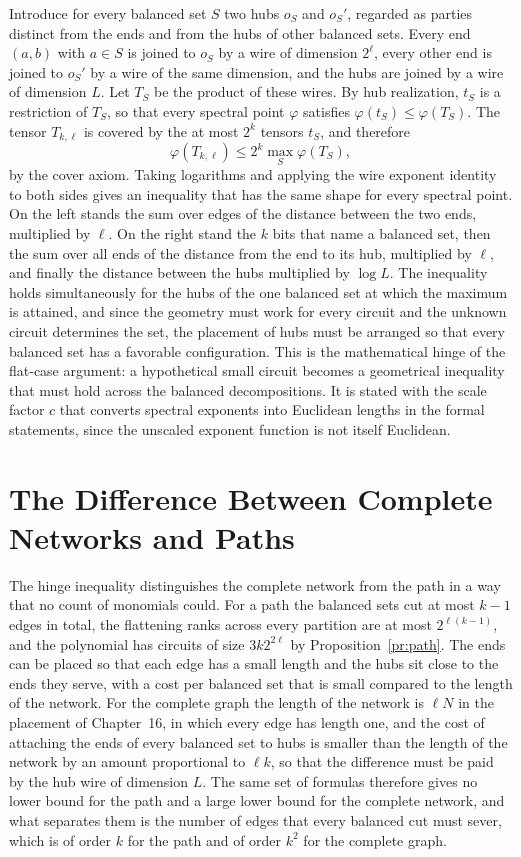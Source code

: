 \documentclass[11pt,letterpaper]{report}
\theoremstyle{plain}
\theoremstyle{definition}
\theoremstyle{remark}
\begin{document}
Introduce for every balanced set $S$ two hubs $o_S$ and $o_S'$, regarded as parties distinct from the ends and from the hubs of other balanced sets. Every end $(a,b)$ with $a\in S$ is joined to $o_S$ by a wire of dimension $2^{\ell}$, every other end is joined to $o_S'$ by a wire of the same dimension, and the hubs are joined by a wire of dimension $L$. Let $T_S$ be the product of these wires. By hub realization, $t_S$ is a restriction of $T_S$, so that every spectral point $\varphi$ satisfies $\varphi(t_S)\le\varphi(T_S)$. The tensor $T_{k,\ell}$ is covered by the at most $2^k$ tensors $t_S$, and therefore
\[
\varphi(T_{k,\ell})\le2^{k}\max_{S}\varphi(T_S),
\]
by the cover axiom. Taking logarithms and applying the wire exponent identity to both sides gives an inequality that has the same shape for every spectral point. On the left stands the sum over edges of the distance between the two ends, multiplied by $\ell$. On the right stand the $k$ bits that name a balanced set, then the sum over all ends of the distance from the end to its hub, multiplied by $\ell$, and finally the distance between the hubs multiplied by $\log L$. The inequality holds simultaneously for the hubs of the one balanced set at which the maximum is attained, and since the geometry must work for every circuit and the unknown circuit determines the set, the placement of hubs must be arranged so that every balanced set has a favorable configuration. This is the mathematical hinge of the flat-case argument: a hypothetical small circuit becomes a geometrical inequality that must hold across the balanced decompositions. It is stated with the scale factor $c$ that converts spectral exponents into Euclidean lengths in the formal statements, since the unscaled exponent function is not itself Euclidean.

\section{The Difference Between Complete Networks and Paths}

The hinge inequality distinguishes the complete network from the path in a way that no count of monomials could. For a path the balanced sets cut at most $k-1$ edges in total, the flattening ranks across every partition are at most $2^{\ell(k-1)}$, and the polynomial has circuits of size $3k2^{2\ell}$ by Proposition~\ref{pr:path}. The ends can be placed so that each edge has a small length and the hubs sit close to the ends they serve, with a cost per balanced set that is small compared to the length of the network. For the complete graph the length of the network is $\ell N$ in the placement of Chapter~16, in which every edge has length one, and the cost of attaching the ends of every balanced set to hubs is smaller than the length of the network by an amount proportional to $\ell k$, so that the difference must be paid by the hub wire of dimension $L$. The same set of formulas therefore gives no lower bound for the path and a large lower bound for the complete network, and what separates them is the number of edges that every balanced cut must sever, which is of order $k$ for the path and of order $k^2$ for the complete graph.
\end{document}
